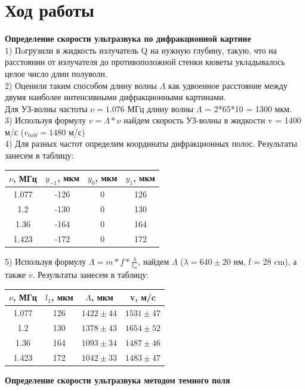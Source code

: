 \documentclass[a4paper,12pt]{article} %
\begin{document}
\section{Ход работы}
\textbf{Определение скорости ультразвука по дифракционной картине} \\
 1) Пoгрузили в жидкость излучатель Q на нужную глубину, такую, что на расстоянии от излучателя до противоположной стенки кюветы укладывалось целое число длин полуволн.\\
 2) Оценили таким способом длину волны $\Lambda$ как удвоенное расстояние между двумя наиболее интенсивными дифракционными картинами. \\
 Для УЗ-волны частоты $\nu = 1.076$ МГц длину волны $\Lambda$ = 2*65*10 = 1300 мкм.\\
 3) Используя формулу $v=\Lambda * \nu$ найдем скорость УЗ-волны в жидкости v = 1400 м/с ($v_{tabl}=1480$ м/с) \\
 4) Для разных частот определим координаты дифракционных полос. Результаты занесем в таблицу: \\
  \begin{center}

 \begin{tabular}{|c|c|c|c|}
 \hline 
 $\nu$, МГц & $y_{-1}$, мкм & $y_{0}$, мкм  & $y_{1}$, мкм  \\ 
 \hline 
 1.077 & -126 & 0 & 126 \\ 
 \hline 
 1.2 & -130 & 0 & 130 \\ 
 \hline 
 1.36 & -164 & 0 & 164 \\ 
 \hline 
 1.423 & -172 & 0 & 172 \\ 
 \hline 
 \end{tabular} 
 \end{center}
 
 5) Используя формулу $\Lambda=m*f*\frac{\lambda}{l_m}$, найдем $\Lambda$ ($\lambda = 640\pm20$ нм, f = 28 cm), а также $v$. Результаты занесем в таблицу:\\
 \begin{center}
 
 \begin{tabular}{|c|c|c|c|}
 \hline 
 $\nu$, МГц & $l_1$, мкм & $\Lambda$, мкм & v, м/c \\ 
 \hline 
 1.077  & 126 & $1422\pm44$ & $1531\pm47$ \\ 
 \hline 
 1.2  &130 & $1378\pm43$ & $1654\pm52$ \\ 
 \hline 
 1.36  &164 & $1093\pm34$ & $1487\pm46$ \\ 
 \hline 
 1.423  &172 & $1042\pm33$ & $1483\pm47$ \\ 
 \hline 
 \end{tabular} 
  \end{center}
\textbf{Определение скорости ультразвука методом темного поля}\\
\end{document}

